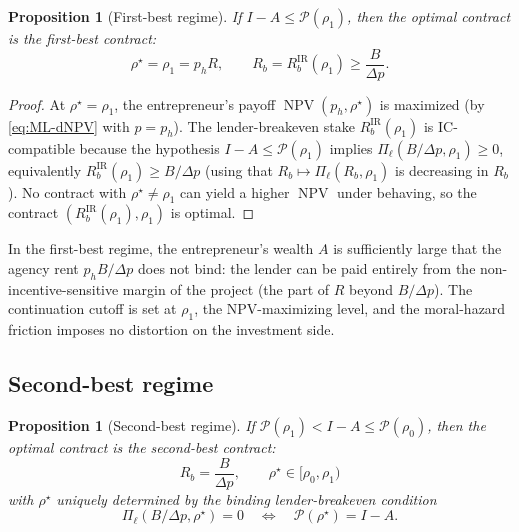 \documentclass[11pt,a4paper,oneside]{book}
\def\leq{\leqslant}
\def\geq{\geqslant}
\DeclareMathOperator{\NPV}{NPV}
\newcommand{\IR}{\mathrm{IR}}
\theoremstyle{plain}
\newtheorem{proposition}[theorem]{Proposition}
\theoremstyle{definition}
\theoremstyle{remark}
\numberwithin{equation}{chapter}
\begin{document}
\begin{proposition}[First-best regime]\label{prop:ML-FB}
If $I - A \leq \mathcal{P}(\rho_1)$, then the optimal contract is the \emph{first-best} contract:
\begin{equation*}
  \rho^\star = \rho_1 = p_h R,
  \qquad
  R_b = R_b^{\IR}(\rho_1) \geq \frac{B}{\Delta p}.
\end{equation*}
\end{proposition}

\begin{proof}
At $\rho^\star = \rho_1$, the entrepreneur's payoff $\NPV(p_h, \rho^\star)$ is maximized (by \eqref{eq:ML-dNPV} with $p = p_h$).
The lender-breakeven stake $R_b^{\IR}(\rho_1)$ is IC-compatible because the hypothesis $I - A \leq \mathcal{P}(\rho_1)$ implies $\Pi_\ell(B/\Delta p, \rho_1) \geq 0$, equivalently $R_b^{\IR}(\rho_1) \geq B/\Delta p$ (using that $R_b \mapsto \Pi_\ell(R_b, \rho_1)$ is decreasing in $R_b$).
No contract with $\rho^\star \neq \rho_1$ can yield a higher $\NPV$ under behaving, so the contract $(R_b^{\IR}(\rho_1), \rho_1)$ is optimal.
\end{proof}

In the first-best regime, the entrepreneur's wealth $A$ is sufficiently large that the agency rent $p_h B/\Delta p$ does not bind: the lender can be paid entirely from the non-incentive-sensitive margin of the project (the part of $R$ beyond $B/\Delta p$).
The continuation cutoff is set at $\rho_1$, the NPV-maximizing level, and the moral-hazard friction imposes no distortion on the investment side.

\subsection{Second-best regime}

\begin{proposition}[Second-best regime]\label{prop:ML-SB}
If $\mathcal{P}(\rho_1) < I - A \leq \mathcal{P}(\rho_0)$, then the optimal contract is the \emph{second-best} contract:
\begin{equation*}
  R_b = \frac{B}{\Delta p},
  \qquad
  \rho^\star \in [\rho_0, \rho_1)
\end{equation*}
with $\rho^\star$ uniquely determined by the binding lender-breakeven condition
\begin{equation}\label{eq:ML-rho-star-SB}
  \Pi_\ell(B/\Delta p, \rho^\star) = 0
  \quad\Longleftrightarrow\quad
  \mathcal{P}(\rho^\star) = I - A.
\end{equation}
\end{proposition}
\end{document}
